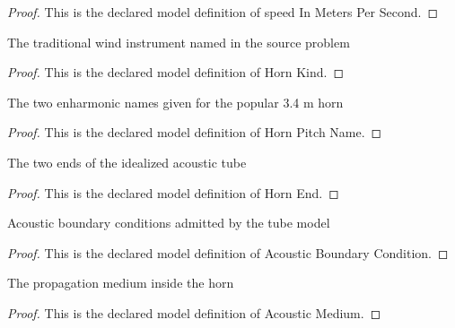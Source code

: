 \begin{proof}
  This is the declared model definition of speed In Meters Per Second.
\end{proof}
\begin{definition}
  \label{def:physics:phyx-mini-0224:phyxminiproblems-problemphyxmini0224-hornkind}
  The traditional wind instrument named in the source problem
\end{definition}
\begin{proof}
  This is the declared model definition of Horn Kind.
\end{proof}
\begin{definition}
  \label{def:physics:phyx-mini-0224:phyxminiproblems-problemphyxmini0224-hornpitchname}
  The two enharmonic names given for the popular 3.4 m horn
\end{definition}
\begin{proof}
  This is the declared model definition of Horn Pitch Name.
\end{proof}
\begin{definition}
  \label{def:physics:phyx-mini-0224:phyxminiproblems-problemphyxmini0224-hornend}
  The two ends of the idealized acoustic tube
\end{definition}
\begin{proof}
  This is the declared model definition of Horn End.
\end{proof}
\begin{definition}
  \label{def:physics:phyx-mini-0224:phyxminiproblems-problemphyxmini0224-acousticboundarycondition}
  Acoustic boundary conditions admitted by the tube model
\end{definition}
\begin{proof}
  This is the declared model definition of Acoustic Boundary Condition.
\end{proof}
\begin{definition}
  \label{def:physics:phyx-mini-0224:phyxminiproblems-problemphyxmini0224-acousticmedium}
  The propagation medium inside the horn
\end{definition}
\begin{proof}
  This is the declared model definition of Acoustic Medium.
\end{proof}
